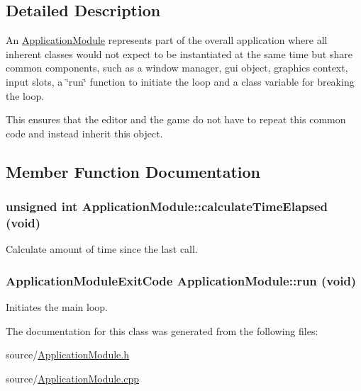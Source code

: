 \subsection{Detailed Description}
An \hyperlink{classApplicationModule}{ApplicationModule} represents part of the overall application where all inherent classes would not expect to be instantiated at the same time but share common components, such as a window manager, gui object, graphics context, input slots, a \char`\"{}run\char`\"{} function to initiate the loop and a class variable for breaking the loop.

This ensures that the editor and the game do not have to repeat this common code and instead inherit this object. 

\subsection{Member Function Documentation}
\hypertarget{classApplicationModule_a5e13bdfbe083a500c653f92c8863c862}{
\subsubsection[{calculateTimeElapsed}]{\setlength{\rightskip}{0pt plus 5cm}unsigned int ApplicationModule::calculateTimeElapsed (void)}}
\label{classApplicationModule_a5e13bdfbe083a500c653f92c8863c862}
Calculate amount of time since the last call. \hypertarget{classApplicationModule_a72494b92d2b093e0827893f527535a1f}{
\subsubsection[{run}]{\setlength{\rightskip}{0pt plus 5cm}ApplicationModuleExitCode ApplicationModule::run (void)}}
\label{classApplicationModule_a72494b92d2b093e0827893f527535a1f}
Initiates the main loop. 

The documentation for this class was generated from the following files:\begin{DoxyCompactItemize}
\item 
source/\hyperlink{ApplicationModule_8h}{ApplicationModule.h}\item 
source/\hyperlink{ApplicationModule_8cpp}{ApplicationModule.cpp}\end{DoxyCompactItemize}
